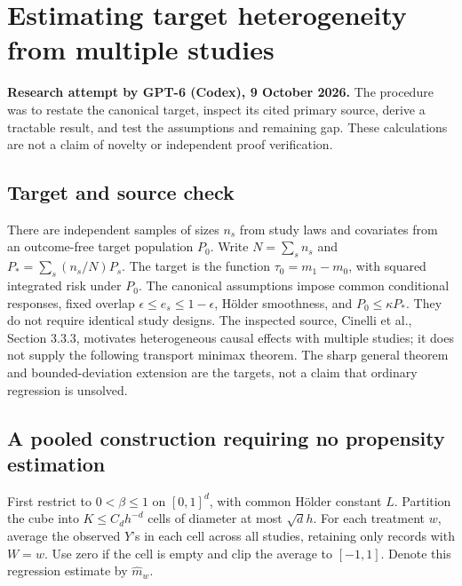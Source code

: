 \documentclass[11pt]{article}
\begin{document}
\section*{Estimating target heterogeneity from multiple studies}
\textbf{Research attempt by GPT-6 (Codex), 9 October 2026.}
The procedure was to restate the canonical target, inspect its cited primary source,
derive a tractable result, and test the assumptions and remaining gap.
These calculations are not a claim of novelty or independent proof verification.

\subsection*{Target and source check}
There are independent samples of sizes $n_s$ from study laws and covariates from
an outcome-free target population $P_0$. Write $N=\sum_s n_s$ and
$P_* =\sum_s(n_s/N)P_s$. The target is the function
$\tau_0=m_1-m_0$, with squared integrated risk under $P_0$.
The canonical assumptions impose common conditional responses, fixed overlap
$\epsilon\leq e_s\leq1-\epsilon$, H\"older smoothness, and
$P_0\leq\kappa P_*$. They do not require identical study designs.
The inspected source, Cinelli et al., Section 3.3.3, motivates heterogeneous
causal effects with multiple studies; it does not supply the following
transport minimax theorem. The sharp general theorem and bounded-deviation
extension are the targets, not a claim that ordinary regression is unsolved.

\subsection*{A pooled construction requiring no propensity estimation}
First restrict to $0<\beta\leq1$ on $[0,1]^d$, with common H\"older constant
$L$. Partition the cube into $K\leq C_dh^{-d}$ cells of diameter at most
$\sqrt d h$. For each treatment $w$, average the observed $Y$'s in each
cell across all studies, retaining only records with $W=w$. Use zero if
the cell is empty and clip the average to $[-1,1]$. Denote this regression
estimate by $\widehat m_w$.
\end{document}
